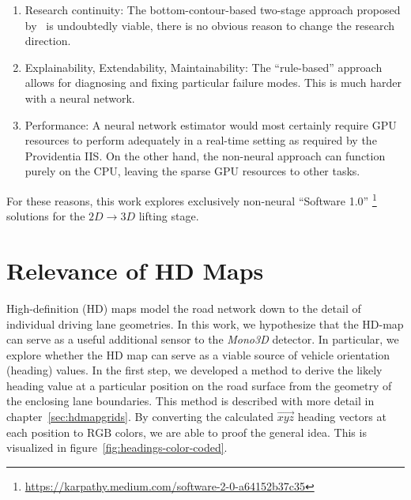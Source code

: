 \begin{enumerate}
    \item Research continuity: The bottom-contour-based two-stage approach proposed by~\cite{leonthesis} is undoubtedly viable, there is no obvious reason to change the research direction.
    \item Explainability, Extendability, Maintainability: The \enquote{rule-based} approach allows for diagnosing and fixing particular failure modes.
    This is much harder with a neural network.
    \item Performance: A neural network estimator would most certainly require GPU resources to perform adequately in a real-time setting as required by the Providentia IIS. On the other hand, the non-neural approach can function purely on the CPU, leaving the sparse GPU resources to other tasks.
\end{enumerate}

For these reasons, this work explores exclusively non-neural \enquote{Software 1.0} \footnote{\hyperlink{https://karpathy.medium.com/software-2-0-a64152b37c35}{https://karpathy.medium.com/software-2-0-a64152b37c35}} solutions for the $2D \rightarrow 3D$ lifting stage.

\section{Relevance of HD Maps}
\label{sec:hdmap}

High-definition (HD) maps model the road network down to the detail of individual driving lane geometries.
In this work, we hypothesize that the HD-map can serve as a useful additional sensor to the \textit{Mono3D} detector.
In particular, we explore whether the HD map can serve as a viable source of vehicle orientation (heading) values.
In the first step, we developed a method to derive the likely heading value at a particular position on the road surface from the geometry of the enclosing lane boundaries.
This method is described with more detail in chapter~\ref{sec:hdmapgrids}.
By converting the calculated $\overrightarrow{xyz}$ heading vectors at each position to $\text{RGB}$ colors, we are able to proof the general idea.
This is visualized in figure~\ref{fig:headings-color-coded}.

